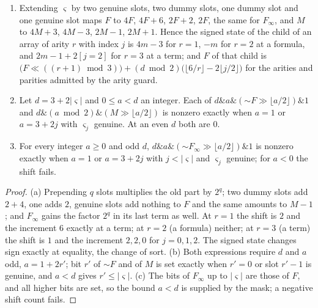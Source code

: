 \begin{lemma}\label{cert:lem:masks}
\begin{enumerate}[label=(\alph*)]
\item Extending $\varsigma$ by two genuine slots, two dummy slots, one dummy slot and one
genuine slot maps $F$ to $4F$, $4F+6$, $2F+2$, $2F$, the same for $F_{\infty}$, and $M$ to
$4M+3$, $4M-3$, $2M-1$, $2M+1$. Hence the signed state of the child of an array of arity
$r$ with index $j$ is $4m-3$ for $r=1$, $-m$ for $r=2$ at a formula, and $2m-1+2[j=2]$ for
$r=3$ at a term; and $F$ of that child is
$\bigl(F\ll((r+1)\bmod 3)\bigr)+(d\bmod 2)\bigl(\lfloor 6/r\rfloor-2\lfloor j/2\rfloor\bigr)$
for the arities and parities admitted by the arity guard.
\item Let $d=3+2\lvert\varsigma\rvert$ and $0\le a<d$ an integer. Each of
$d\mathbin{\&}a\mathbin{\&}(\mathord{\sim}F\gg\lfloor a/2\rfloor)\mathbin{\&}1$ and
$d\mathbin{\&}(a\bmod 2)\mathbin{\&}(M\gg\lfloor a/2\rfloor)$ is nonzero exactly when
$a=1$ or $a=3+2j$ with $\varsigma_j$ genuine. At an even $d$ both are $0$.
\item For every integer $a\ge 0$ and odd $d$,
$d\mathbin{\&}a\mathbin{\&}(\mathord{\sim}F_{\infty}\gg\lfloor a/2\rfloor)\mathbin{\&}1$ is
nonzero exactly when $a=1$ or $a=3+2j$ with $j<\lvert\varsigma\rvert$ and $\varsigma_j$
genuine; for $a<0$ the shift fails.
\end{enumerate}
\end{lemma}
\begin{proof}
(a) Prepending $q$ slots multiplies the old part by $2^{q}$; two dummy slots add $2+4$,
one adds $2$, genuine slots add nothing to $F$ and the same amounts to $M-1$; and
$F_{\infty}$ gains the factor $2^{q}$ in its last term as well. At $r=1$ the shift is $2$
and the increment $6$ exactly at a term; at $r=2$ (a formula) neither; at $r=3$ (a term)
the shift is $1$ and the increment $2,2,0$ for $j=0,1,2$. The signed state changes sign
exactly at equality, the change of sort. (b) Both expressions require $d$ and $a$ odd,
$a=1+2r'$; bit $r'$ of $\mathord{\sim}F$ and of $M$ is set exactly when $r'=0$ or slot
$r'-1$ is genuine, and $a<d$ gives $r'\le\lvert\varsigma\rvert$. (c) The bits of
$F_{\infty}$ up to $\lvert\varsigma\rvert$ are those of $F$, and all higher bits are set,
so the bound $a<d$ is supplied by the mask; a negative shift count fails.
\end{proof}

